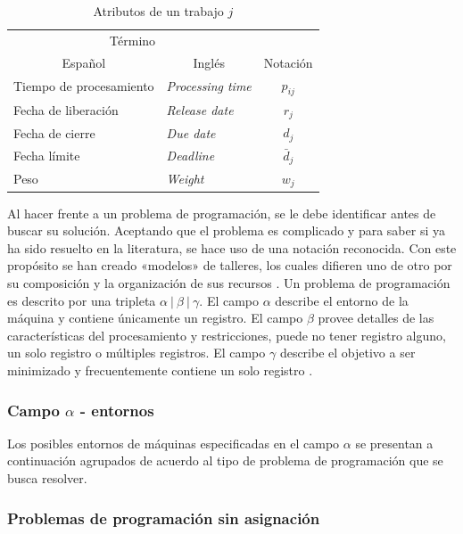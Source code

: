 \documentclass[spanish,draft,12pt,headsepline,footsepline,paper=letter]{scrreprt}
\begin{document}
\begin{table}
\centering
\begin{tabular}{llc}
\toprule
  \multicolumn{2}{c}{Término} \\
  \cmidrule(r){1-2}
  \multicolumn{1}{c}{Español} & \multicolumn{1}{c}{Inglés} & Notación \\
  \midrule
  Tiempo de procesamiento & \textit{Processing time} & $p_{ij}$ \\
  Fecha de liberación     & \textit{Release date}    & $r_j$ \\
  Fecha de cierre & \textit{Due date} & $d_j$ \\
  Fecha límite & \textit{Deadline} & $\bar{d}_j$ \\
  Peso & \textit{Weight} & $w_j$ \\
  \bottomrule
\end{tabular}
  \caption{Atributos de un trabajo $j$}
  \label{tab:job_attributes}
\end{table}

Al hacer frente a un problema de programación, se le debe identificar antes de buscar su solución. Aceptando que el problema es complicado y para saber si ya ha sido resuelto en la literatura, se hace uso de una notación reconocida. Con este propósito se han creado «modelos» de talleres, los cuales difieren uno de otro por su composición y la organización de sus recursos \citep[p.~7]{TKindt2002}. Un problema de programación es descrito por una tripleta $\alpha\: |\: \beta\: |\: \gamma$. El campo $\alpha$ describe el entorno de la máquina y contiene únicamente un registro. El campo $\beta$ provee detalles de las características del procesamiento y restricciones, puede no tener registro alguno, un solo registro o múltiples registros. El campo $\gamma$ describe el objetivo a ser minimizado y frecuentemente contiene un solo registro \citep[p.~14]{Pinedo1995}.

\subsubsection{Campo $\alpha$ - entornos}

Los posibles entornos de máquinas especificadas en el campo $\alpha$ se presentan a continuación agrupados de acuerdo al tipo de problema de programación que se busca resolver.

\subsubsection{Problemas de programación sin asignación}
\end{document}
